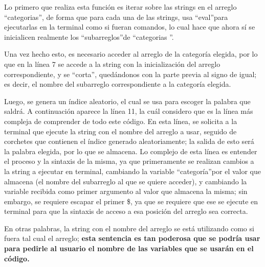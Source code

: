 \documentclass[letter,12pt]{article} %
\begin{document}
Lo primero que realiza esta función es iterar sobre las strings en el arreglo \textquotedblleft categorias\textquotedblright, de forma que para cada una de las strings, usa \textquotedblleft eval\textquotedblright para ejecutarlas en la terminal como si fueran comandos, lo cual hace que ahora sí se inicialicen realmente los \textquotedblleft subarreglos\textquotedblright de \textquotedblleft categorias \textquotedblright.\\
\vspace{\baselineskip}

Una vez hecho esto, es necesario acceder al arreglo de la categoría elegida, por lo que en la línea 7 se accede a la string con la inicialización del arreglo correspondiente, y se \textquotedblleft corta\textquotedblright, quedándonos con la parte previa al signo de igual; es decir, el nombre del subarreglo correspondiente a la categoría elegida.\\
\vspace{\baselineskip}

Luego, se genera un índice aleatorio, el cual se usa para escoger la palabra que saldrá. A continuación aparece la línea 11, la cuál considero que es la línea más compleja de comprender de todo este código. En esta línea, se solicita a la terminal que ejecute la string con el nombre del arreglo a usar, seguido de corchetes que contienen el índice generado aleatoriamente; la salida de esto será la palabra elegida, por lo que se almacena. Lo complejo de esta línea es entender el proceso y la sintaxis de la misma, ya que primeramente se realizan cambios a la string a ejecutar en terminal, cambiando la variable \textquotedblleft categoría\textquotedblright por el valor que almacena (el nombre del subarreglo al que se quiere acceder), y cambiando la variable recibida como primer argumento al valor que almacena la misma; sin embargo, se requiere escapar el primer \$, ya que se requiere que ese se ejecute en terminal para que la sintaxis de acceso a esa posición del arreglo sea correcta.\\
\vspace{\baselineskip}

En otras palabras, la string con el nombre del arreglo se está utilizando como si fuera tal cual el arreglo; \textbf{esta sentencia es tan poderosa que se podría usar para pedirle al usuario el nombre de las variables que se usarán en el código.}\\
\vspace{\baselineskip}
\end{document}
